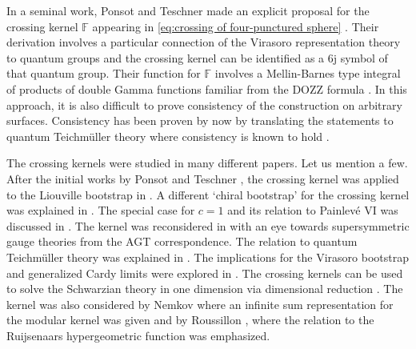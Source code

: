 \documentclass[12pt,a4paper]{article}
\begin{document}
In a seminal work, Ponsot and Teschner made an explicit proposal for the crossing kernel $\mathbb{F}$ appearing in \eqref{eq:crossing of four-punctured sphere} \cite{Ponsot:1999uf, Ponsot:2000mt}. Their derivation involves a particular connection of the Virasoro representation theory to quantum groups and the crossing kernel can be identified as a 6j symbol of that quantum group. Their function for $\mathbb{F}$ involves a Mellin-Barnes type integral of products of double Gamma functions familiar from the DOZZ formula \cite{Dorn:1994xn, Zamolodchikov:1995aa}. In this approach, it is also difficult to prove consistency of the construction on arbitrary surfaces. Consistency has been proven by now by translating the statements to quantum Teichm\"uller theory where consistency is known to hold \cite{Chekhov:1999tn, Kashaev:1998fc, Teschner:2013tqy}.

The crossing kernels were studied in many different papers. Let us mention a few. After the initial works by Ponsot and Teschner \cite{Ponsot:1999uf, Ponsot:2000mt}, 
the crossing kernel was applied to the Liouville bootstrap in \cite{Teschner:2001rv, Ponsot:2001ng}.
A different `chiral bootstrap' for the crossing kernel was explained in \cite{Teschner:2001rv, Teschner:2003en}.
The special case for $c=1$ and its relation to Painlev\'e VI was discussed in \cite{Iorgov:2013uoa}. 
The kernel was reconsidered in \cite{Teschner:2012em, Teschner:2013tqy} with an eye towards supersymmetric gauge theories from the AGT correspondence.
The relation to quantum Teichm\"uller theory was explained in \cite{Nidaiev:2013bda, Collier:2023fwi}.
The implications for the Virasoro bootstrap and generalized Cardy limits were explored in \cite{Collier:2018exn, Kusuki:2018wpa, Collier:2019weq}. The crossing kernels can be used to solve the Schwarzian theory in one dimension via dimensional reduction \cite{Mertens:2017mtv}.
The kernel was also considered by Nemkov \cite{Nemkov:2014rsa, Nemkov:2015zha} where an infinite sum representation for the modular kernel was given and by Roussillon \cite{Roussillon:2020lyc}, where the relation to the Ruijsenaars hypergeometric function was emphasized. 


\medskip
\end{document}
